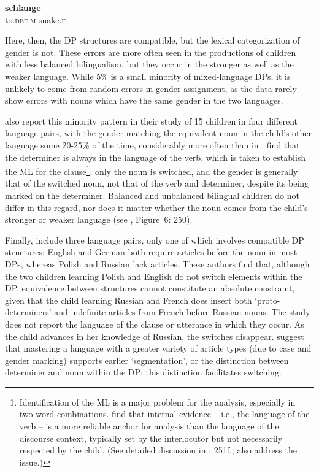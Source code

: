 \documentclass[output=paper]{langscibook}
\begin{document}
\ea%
    \label{ex:vihmannvihmann:1}
 \textbf{{schlange}}\footnotemark\\
  to.\textsc{def}.\textsc{m}  snake.\textsc{f}\\%
  \z
{}


Here, then, the DP structures are compatible, but the lexical categorization of gender is not. These errors are more often seen in the productions of children with less balanced bilingualism, but they occur in the stronger as well as the weaker language. While 5\% is a small minority of mixed-language DPs, it is unlikely to come from random errors in gender assignment, as the data rarely show errors with nouns which have the same gender in the two languages. 

\citet{EichlerEtAl2012} also report this minority pattern in their study of 15 children in four different language pairs, with the gender matching the equivalent noun in the child’s other language some 20-25\% of the time, considerably more often than in \citet{CantoneMüller2008}. \citet{EichlerEtAl2012} find that the determiner is always in the language of the verb, which is taken to establish the ML for the clause\footnote{Identification of the ML is a major problem for the analysis, especially in two-word combinations. \citet{EichlerEtAl2012} find that internal evidence – i.e., the language of the verb – is a more reliable anchor for analysis than the language of the discourse context, typically set by the interlocutor but not necessarily respected by the child. (See detailed discussion in \citealt{ParadisEtAl2000}: 251f.; \citealt{BernardiniSchlyter2004} also address the issue.)}; only the noun is switched, and the gender is generally that of the switched noun, not that of the verb and determiner, despite its being marked on the determiner. Balanced and unbalanced bilingual children do not differ in this regard, nor does it matter whether the noun comes from the child’s stronger or weaker language (see \citealt{EichlerEtAl2012}, Figure~6: 250).

Finally, \citet{GaskinsEtAl2021} include three language pairs, only one of which involves compatible DP structures: English and German both require articles before the noun in most DPs, whereas Polish and Russian lack articles. These authors find that, although the two children learning Polish and English do not switch elements within the DP, equivalence between structures cannot constitute an absolute constraint, given that the child learning Russian and French does insert both ‘proto-determiners’ and indefinite articles from French before Russian nouns. The study does not report the language of the clause or utterance in which they occur. As the child advances in her knowledge of Russian, the switches disappear. \citet{GaskinsEtAl2021} suggest that mastering a language with a greater variety of article types (due to case and gender marking) supports earlier ‘segmentation’, or the distinction between determiner and noun within the DP; this distinction facilitates switching. 
\end{document}
